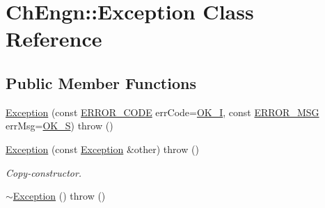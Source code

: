 \hypertarget{classChEngn_1_1Exception}{
\section{ChEngn::Exception Class Reference}
\label{classChEngn_1_1Exception}
}
\subsection*{Public Member Functions}
\begin{DoxyCompactItemize}
\item 
\hyperlink{classChEngn_1_1Exception_af59b66bd5a147479869c9df081f0c53f}{Exception} (const \hyperlink{namespaceChEngn_a347ab4e4a29f725ed0253d8311c82233}{ERROR\_\-CODE} errCode=\hyperlink{namespaceChEngn_a58f231c1008467b4b6cfb17b190293a5}{OK\_\-I}, const \hyperlink{namespaceChEngn_a01b85c98a5b00144710f14c2e5c11656}{ERROR\_\-MSG} errMsg=\hyperlink{namespaceChEngn_a669b96f20597d4a0b00d4c9e4db68ee8}{OK\_\-S})  throw ()
\item 
\hypertarget{classChEngn_1_1Exception_a5f404e2a9925706a99d8796e65d2a1cc}{
\hyperlink{classChEngn_1_1Exception_a5f404e2a9925706a99d8796e65d2a1cc}{Exception} (const \hyperlink{classChEngn_1_1Exception}{Exception} \&other)  throw ()}
\label{classChEngn_1_1Exception_a5f404e2a9925706a99d8796e65d2a1cc}

\begin{DoxyCompactList}\small\item\em Copy-\/constructor. \item\end{DoxyCompactList}\item 
\hypertarget{classChEngn_1_1Exception_a6fc50135102ba663b36673ad855c483f}{
\hyperlink{classChEngn_1_1Exception_a6fc50135102ba663b36673ad855c483f}{$\sim$Exception} ()  throw ()}
\label{classChEngn_1_1Exception_a6fc50135102ba663b36673ad855c483f}


\end{DoxyCompactItemize}
